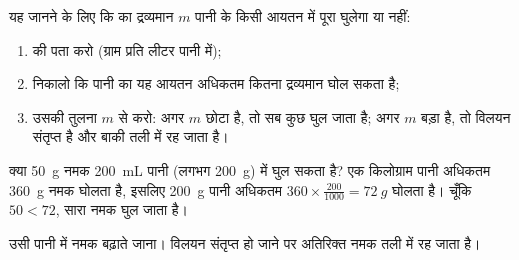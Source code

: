 \begin{method}[क्या पूरा घुल जाएगा?]\label{met:g6:solutions-and-solubility:will-it}
यह जानने के लिए कि  का द्रव्यमान $m$ पानी के किसी आयतन में पूरा घुलेगा
या नहीं:
\begin{enumerate}
  \item {} की  पता करो (ग्राम प्रति लीटर पानी में);
  \item निकालो कि पानी का यह आयतन अधिकतम कितना द्रव्यमान घोल सकता है;
  \item उसकी तुलना $m$ से करो: अगर $m$ छोटा है, तो सब कुछ घुल जाता है; अगर $m$
        बड़ा है, तो विलयन संतृप्त है और बाकी तली में
        रह जाता है।
\end{enumerate}
\end{method}

\begin{example}[गिलास में नमक]\label{ex:g6:solutions-and-solubility:glass}
क्या \qty{50}{g} नमक \qty{200}{mL} पानी (लगभग \qty{200}{g}) में घुल
सकता है? एक किलोग्राम पानी अधिकतम \qty{360}{g} नमक घोलता है,
इसलिए \qty{200}{g} पानी अधिकतम $360 \times
\frac{200}{1000} = \qty{72}{g}$ घोलता है। चूँकि $50 < 72$, सारा नमक
घुल जाता है।
\end{example}

\begin{omfigure}

{\small उसी पानी में नमक बढ़ाते जाना। विलयन संतृप्त हो जाने पर
अतिरिक्त नमक तली में रह जाता है।}
\end{omfigure}

